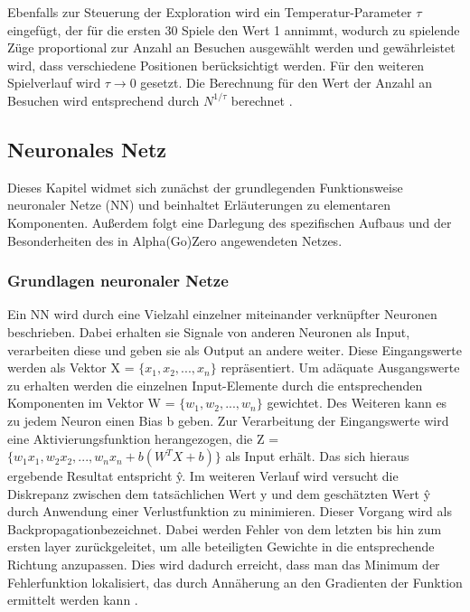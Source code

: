 \documentclass[12pt,a4paper]{article}
\begin{document}
Ebenfalls zur Steuerung der Exploration wird ein Temperatur-Parameter $\tau$ eingefügt, der für die ersten 30 Spiele den Wert 1 annimmt, wodurch zu spielende Züge proportional zur Anzahl an Besuchen ausgewählt werden und gewährleistet wird, dass verschiedene Positionen berücksichtigt werden.  Für den weiteren Spielverlauf wird $\tau \rightarrow 0$ gesetzt. Die Berechnung für den Wert der Anzahl an Besuchen wird entsprechend durch $N^{1/\tau}$ berechnet \cite{Silver2017}.

\newpage
\subsection{Neuronales Netz}

Dieses Kapitel widmet sich zunächst der grundlegenden Funktionsweise neuronaler Netze (NN) und beinhaltet Erläuterungen zu elementaren Komponenten. Außerdem folgt eine Darlegung des spezifischen Aufbaus und der Besonderheiten des in Alpha(Go)Zero angewendeten Netzes.

\subsubsection{Grundlagen neuronaler Netze}
Ein NN wird durch eine Vielzahl einzelner miteinander verknüpfter Neuronen beschrieben. Dabei erhalten sie Signale von anderen Neuronen als Input, verarbeiten diese und geben sie als Output an andere weiter. Diese Eingangswerte werden als Vektor X = $\{x_{1}, x_{2}, ..., x_{n}\}$ repräsentiert. Um adäquate Ausgangswerte zu erhalten werden die einzelnen Input-Elemente durch die entsprechenden Komponenten im Vektor W = $\{w_{1}, w_{2}, ..., w_{n}\}$ gewichtet. Des Weiteren kann es zu jedem Neuron einen Bias b geben. Zur Verarbeitung der Eingangswerte wird eine Aktivierungsfunktion herangezogen, die Z = $\{w_{1}x_{1}, w_{2}x_{2}, ..., w_{n}x_{n} + b(W^{T}X + b)\}$ als Input erhält. Das sich hieraus ergebende Resultat entspricht \^{y}. Im weiteren Verlauf wird versucht die Diskrepanz zwischen dem tatsächlichen Wert y und dem geschätzten Wert \^{y} durch Anwendung einer Verlustfunktion zu minimieren. Dieser Vorgang wird als \glqq{}Backpropagation\grqq bezeichnet. Dabei werden Fehler von dem letzten bis hin zum ersten layer zurückgeleitet, um alle beteiligten Gewichte in die entsprechende Richtung anzupassen. Dies wird dadurch erreicht, dass man das Minimum der Fehlerfunktion lokalisiert, das durch Annäherung an den Gradienten der Funktion ermittelt werden kann \cite[S. 75-79]{Sewak2019}. 
\end{document}
